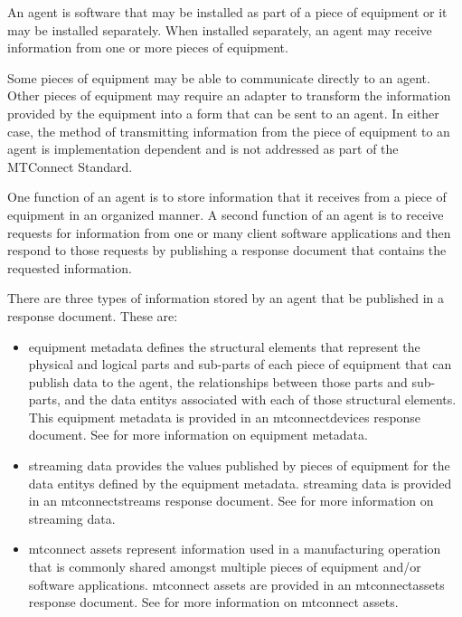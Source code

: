 An \gls{agent} is software that may be installed as part of a piece of equipment or it may be installed separately.  When installed separately, an \gls{agent} may receive information from one or more pieces of equipment.

Some pieces of equipment may be able to communicate directly to an \gls{agent}.  Other pieces of equipment may require an \gls{adapter} to transform the information provided by the equipment into a form that can be sent to an \gls{agent}.  In either case, the method of transmitting information from the piece of equipment to an \gls{agent} is implementation dependent and is not addressed as part of the MTConnect Standard.

One function of an \gls{agent} is to store information that it receives from a piece of equipment in an organized manner.  A second function of an \gls{agent} is to receive \glspl{request} for information from one or many client software applications and then respond to those \glspl{request} by publishing a \gls{response document} that contains the requested information.

There are three types of information stored by an \gls{agent} that \MAY be published in a \gls{response document}.  These are:

\begin{itemize}

\item \gls{equipment metadata} defines the \glspl{structural element} that represent the physical and logical parts and sub-parts of each piece of equipment that can publish data to the \gls{agent}, the relationships between those parts and sub-parts, and the \glspl{data entity} associated with each of those \glspl{structural element}.  This \gls{equipment metadata} is provided in an \gls{mtconnectdevices response document}. See  for more information on \gls{equipment metadata}.

\item \gls{streaming data} provides the values published by pieces of equipment for the \glspl{data entity} defined by the \gls{equipment metadata}.  \gls{streaming data} is provided in an \gls{mtconnectstreams response document}.  See  for more information on \gls{streaming data}.

\item \glspl{mtconnect asset} represent information used in a manufacturing operation that is commonly shared amongst multiple pieces of equipment and/or software applications.  \glspl{mtconnect asset} are provided in an \gls{mtconnectassets response document}.  See  for more information on \glspl{mtconnect asset}.

\end{itemize}

